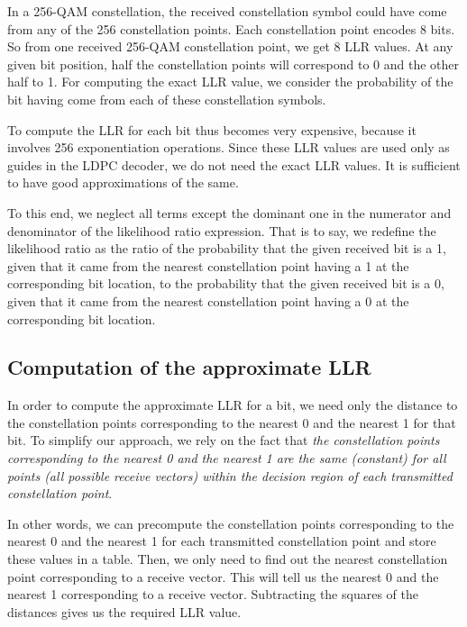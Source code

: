 In a 256-QAM constellation, the received constellation symbol could have come
from any of the 256 constellation points. Each constellation point encodes 8
bits. So from one received 256-QAM constellation point, we get 8 LLR values. At
any given bit position, half the constellation points will correspond to 0 and
the other half to 1. For computing the exact LLR value, we consider the
probability of the bit having come from each of these constellation symbols.


To compute the LLR for each bit thus becomes very expensive, because it
involves 256 exponentiation operations. Since these LLR values are used only as
guides in the LDPC decoder, we do not need the exact LLR values. It is
sufficient to have good approximations of the same.

To this end, we neglect all terms except the dominant one in the numerator and
denominator of the likelihood ratio expression. That is to say, we redefine the
likelihood ratio as the ratio of the probability that the given received bit is
a 1, given that it came from the nearest constellation point having a 1 at the
corresponding bit location, to the probability that the given received bit is a
0, given that it came from the nearest constellation point having a 0 at the
corresponding bit location.


\subsection{Computation of the approximate LLR}

In order to compute the approximate LLR for a bit, we need only the distance to
the constellation points corresponding to the nearest 0 and the nearest 1 for
that bit. To simplify our approach, we rely on the fact that \emph{the
constellation points corresponding to the nearest 0 and the nearest 1 are the
same (constant) for all points (all possible receive vectors) within the
decision region of each transmitted constellation point}.

In other words, we can precompute the constellation points corresponding to the
nearest 0 and the nearest 1 for each transmitted constellation point and store
these values in a table.  Then, we only need to find out the nearest
constellation point corresponding to a receive vector. This will tell us the
nearest 0 and the nearest 1 corresponding to a receive vector. Subtracting the
squares of the distances gives us the required LLR value.

